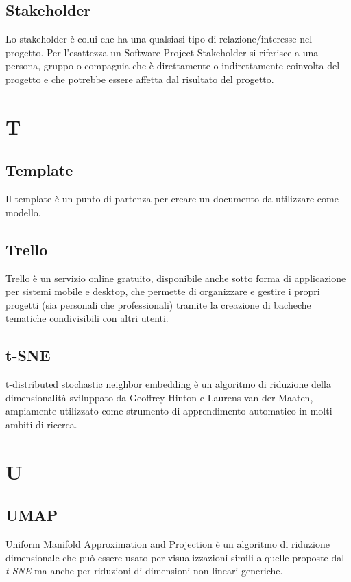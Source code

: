 \subsection{Stakeholder}
Lo stakeholder è colui che ha una qualsiasi tipo di relazione/interesse nel progetto. Per l'esattezza
un Software Project Stakeholder si riferisce a una persona, gruppo o compagnia che è direttamente o indirettamente coinvolta
del progetto e che potrebbe essere affetta dal risultato del progetto. 

\newpage
\section{T}
\subsection{Template}
Il template è un punto di partenza per creare un documento da utilizzare come modello.

\subsection{Trello}
Trello è un servizio online gratuito, disponibile anche sotto forma di applicazione per sistemi mobile e desktop, che permette di organizzare e gestire i propri progetti (sia personali che professionali) tramite la creazione di bacheche tematiche condivisibili con altri utenti.

\subsection{t-SNE}
t-distributed stochastic neighbor embedding è un algoritmo di riduzione della dimensionalità sviluppato da Geoffrey Hinton e Laurens van der Maaten, ampiamente utilizzato come strumento di apprendimento automatico in molti ambiti di ricerca.

\newpage
\section{U}
\subsection{UMAP}
Uniform Manifold Approximation and Projection è un algoritmo di riduzione dimensionale che può essere usato per visualizzazioni simili a quelle proposte dal \textit{t-SNE} ma anche per  riduzioni di dimensioni non lineari generiche.

